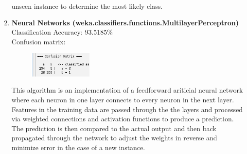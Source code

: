 \documentclass{article}
\begin{document}
\begin{enumerate}[label = (\alph*), left=10pt, itemsep=10pt]
\begin{minipage}[t]{0.9\textwidth}
            unseen instance to determine the most likely class. 
        \end{minipage}
        \item \begin{minipage}[t]{0.9\textwidth}
            \textbf{Neural Networks (weka.classifiers.functions.MultilayerPerceptron)}\\
             Classification Accuracy: 93.5185\%\\
             Confusion matrix:\\
             \begin{figure}[H]
                \includegraphics[width=0.3\textwidth, height=0.1\textheight]{./6e2.png}
            \end{figure}
            This algorithm is an implementation of a feedforward ariticial neural network where each neuron in one layer
            connects to every neuron in the next layer. Features in the training data are passed through the the layers
            and processed via weighted connections and activation functions to produce a prediction. The prediction is then
            compared to the actual output and then back propagated through the network to adjust the weights
            in reverse and minimize error in the case of a new instance.
        \end{minipage}

    \end{enumerate}
\end{document}
